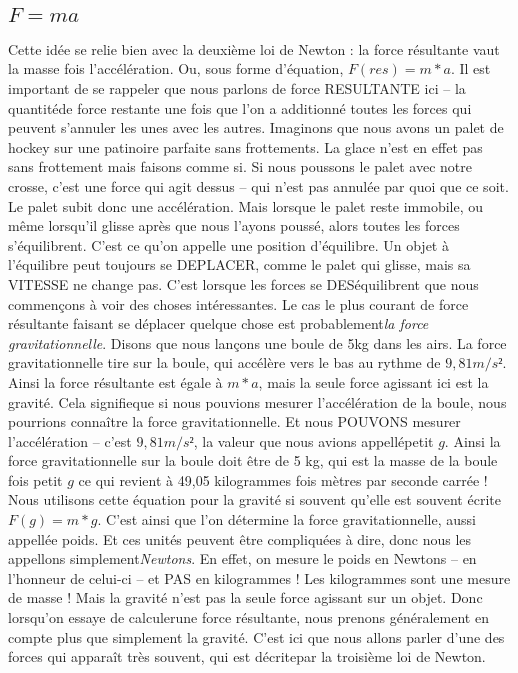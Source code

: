 \documentclass[a4paper, twoside]{article}
\begin{document}
\hypertarget{f-ma}{%
\subsection{\texorpdfstring{\(F = ma\)}{F = ma}}\label{f-ma}}

Cette idée se relie bien avec la deuxième loi de Newton : la force
résultante vaut la masse fois l'accélération. Ou, sous forme d'équation,
\(F(res) = m*a\). Il est important de se rappeler que nous parlons de
force RESULTANTE ici -- la quantitéde force restante une fois que l'on a
additionné toutes les forces qui peuvent s'annuler les unes avec les
autres. Imaginons que nous avons un palet de hockey sur une patinoire
parfaite sans frottements. La glace n'est en effet pas sans frottement
mais faisons comme si. Si nous poussons le palet avec notre crosse,
c'est une force qui agit dessus -- qui n'est pas annulée par quoi que ce
soit. Le palet subit donc une accélération. Mais lorsque le palet reste
immobile, ou même lorsqu'il glisse après que nous l'ayons poussé, alors
toutes les forces s'équilibrent. C'est ce qu'on appelle une position
d'équilibre. Un objet à l'équilibre peut toujours se DEPLACER, comme le
palet qui glisse, mais sa VITESSE ne change pas. C'est lorsque les
forces se DESéquilibrent que nous commençons à voir des choses
intéressantes. Le cas le plus courant de force résultante faisant se
déplacer quelque chose est probablement\emph{la force gravitationnelle}.
Disons que nous lançons une boule de 5kg dans les airs. La force
gravitationnelle tire sur la boule, qui accélère vers le bas au rythme
de \(9, 81 m/s²\). Ainsi la force résultante est égale à \(m*a\), mais
la seule force agissant ici est la gravité. Cela signifieque si nous
pouvions mesurer l'accélération de la boule, nous pourrions connaître la
force gravitationnelle. Et nous POUVONS mesurer l'accélération -- c'est
\(9, 81 m/s²\), la valeur que nous avions appellépetit \(g\). Ainsi la
force gravitationnelle sur la boule doit être de 5 kg, qui est la masse
de la boule fois petit \(g\) ce qui revient à 49,05 kilogrammes fois
mètres par seconde carrée ! Nous utilisons cette équation pour la
gravité si souvent qu'elle est souvent écrite \(F(g) = m*g\). C'est
ainsi que l'on détermine la force gravitationnelle, aussi appellée
poids. Et ces unités peuvent être compliquées à dire, donc nous les
appellons simplement\emph{Newtons}. En effet, on mesure le poids en
Newtons -- en l'honneur de celui-ci -- et PAS en kilogrammes ! Les
kilogrammes sont une mesure de masse ! Mais la gravité n'est pas la
seule force agissant sur un objet. Donc lorsqu'on essaye de calculerune
force résultante, nous prenons généralement en compte plus que
simplement la gravité. C'est ici que nous allons parler d'une des forces
qui apparaît très souvent, qui est décritepar la troisième loi de
Newton.
\end{document}
